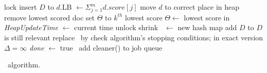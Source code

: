 \begin{algorithm*}[tbh]
\begin{multicols}{2}
\begin{algorithmic}[1]
\Statex


{} 
\State lock \DHeap \label{l:lock-heap}
	\State insert $D$ to \DHeap
	  \label{l:for-all-heap-docs}
		\State $d$.LB $\leftarrow \Sigma_{j=1}^{m} d.score[j]$
		\State move $d$ to correct place in heap \label{l:fix-heap}
	\EndFor
		\State remove lowest scored doc %
	\EndIf
		 \Comment set $\Theta$ to $k^{th}$ lowest score
		\State  $\Theta \leftarrow$ lowest score in \DHeap
	\EndIf
	\State \emph{HeapUpdateTime} $\leftarrow$ current time 
\EndIf
\State unlock \DHeap  \label{l:unlock-heap}
\EndProcedure
%
%
\Statex 
\Statex
{} \label{l:clean-start}
\If{$|\DMap | > \Phi $} 
 \Comment shrink \DMap 
\State \LDMap\ $\leftarrow$ new hash map \label{l:clean-local-copy}
{} 
	\State add   $D$ to \LDMap \Comment $D$ is still relevant
\EndIf
\EndFor
\State replace \DMap\ by \LDMap \label{l:clean-replace}
\EndIf
\Statex
\Statex \Comment check algorithm's stopping conditions; in exact version $\Delta=\infty$
\State \emph{done} $\leftarrow$ true
\Else\ add {\sc cleaner()} to job queue
\EndIf
\label{l:clean-end}
\EndProcedure 
\Statex
\end{algorithmic}
\end{multicols}
\caption{\alg\ algorithm.}
\label{alg:sparta}
\end{algorithm*}